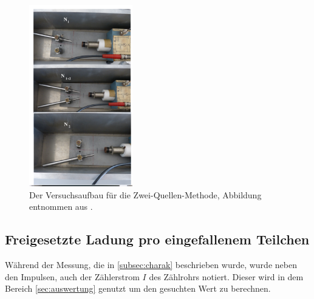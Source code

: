 \begin{figure}
    \centering
    \includegraphics[width=0.4\textwidth]{content/data/aufbau.png}
    \caption{Der Versuchsaufbau für die Zwei-Quellen-Methode, Abbildung entnommen aus \cite{anleitung}.}
    \label{fig:aufbau}
\end{figure}
\FloatBarrier
\subsection{Freigesetzte Ladung pro eingefallenem Teilchen}
Während der Messung, die in \ref{subsec:charak} beschrieben wurde, wurde neben den Impulsen, auch der Zählerstrom $I$ des Zählrohrs notiert.
Dieser wird in dem Bereich \ref{sec:auswertung} genutzt um den gesuchten Wert zu berechnen.